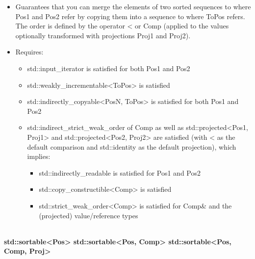 \begin{itemize}
\item
Guarantees that you can merge the elements of two sorted sequences to where Pos1 and Pos2 refer by copying them into a sequence to where ToPos refers. The order is defined by the operator < or Comp (applied to the values optionally transformed with projections Proj1 and Proj2).

\item
Requires:
\begin{itemize}
\item
std::input\_iterator is satisfied for both Pos1 and Pos2

\item
std::weakly\_incrementable<ToPos> is satisfied

\item
std::indirectly\_copyable<PosN, ToPos> is satisfied for both Pos1 and Pos2

\item
std::indirect\_strict\_weak\_order of Comp as well as std::projected<Pos1, Proj1> and std::projected<Pos2, Proj2> are satisfied (with < as the default comparison and std::identity as the default projection), which implies:

\begin{itemize}
\item
std::indirectly\_readable is satisfied for Pos1 and Pos2

\item
std::copy\_constructible<Comp> is satisfied

\item
std::strict\_weak\_order<Comp> is satisfied for Comp\& and the (projected) value/reference types
\end{itemize}
\end{itemize}
\end{itemize}

\noindent
\hspace*{\fill} \\ %
\textbf{std::sortable<Pos>
	std::sortable<Pos, Comp>
	std::sortable<Pos, Comp, Proj>}

